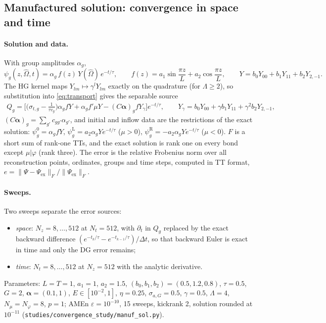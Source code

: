 \documentclass[11pt,a4paper]{article}
\newcommand{\Om}{\hat{\Omega}}
\newcommand{\Lmax}{\Lambda}
\newcommand{\code}[1]{\texttt{#1}}
\begin{document}
\subsection{Manufactured solution: convergence in space and time}
\label{sec:mms}

\paragraph{Solution and data.} With group amplitudes $\alpha_g$,
\begin{equation}
\psi_g(z,\Om,t)=\alpha_g\,f(z)\,Y(\Om)\,e^{-t/\tau},\qquad
f(z)=a_1\sin\frac{\pi z}{L}+a_2\cos\frac{\pi z}{L},\qquad
Y=b_0Y_{00}+b_1Y_{11}+b_2Y_{2,-1}.
\end{equation}
The HG kernel maps $Y_{lm}\mapsto\gamma^lY_{lm}$ exactly on the quadrature (for $\Lmax\ge2$), so substitution into \eqref{eq:transport} gives the separable source
\begin{gather}
Q_g=\Big[\Big(\sigma_{t,g}-\frac{1}{\tau v_g}\Big)\alpha_gfY+\alpha_gf'\mu Y-(C\bm\alpha)_gfY_\gamma\Big]e^{-t/\tau},\qquad
Y_\gamma=b_0Y_{00}+\gamma b_1Y_{11}+\gamma^2b_2Y_{2,-1},
\end{gather}
$(C\bm\alpha)_g=\sum_{g'}c_{gg'}\alpha_{g'}$, and initial and inflow data are the restrictions of the exact solution: $\psi^0_g=\alpha_gfY$, $\psi^{\mathrm L}_g=a_2\alpha_gYe^{-t/\tau}$ ($\mu>0$), $\psi^{\mathrm R}_g=-a_2\alpha_gYe^{-t/\tau}$ ($\mu<0$). $F$ is a short sum of rank-one TTs, and the exact solution is rank one on every bond except $\mu|\varphi$ (rank three). The error is the relative Frobenius norm over all reconstruction points, ordinates, groups and time steps, computed in TT format, $e=\|\Psi-\Psi_{\mathrm{ex}}\|_F/\|\Psi_{\mathrm{ex}}\|_F$.

\paragraph{Sweeps.} Two sweeps separate the error sources:
\begin{itemize}[nosep]
\item \emph{space}: $N_z=8,\dots,512$ at $N_t=512$, with $\partial_t$ in $Q_g$ replaced by the exact backward difference $(e^{-t_k/\tau}-e^{-t_{k-1}/\tau})/\Delta t$, so that backward Euler is exact in time and only the DG error remains;
\item \emph{time}: $N_t=8,\dots,512$ at $N_z=512$ with the analytic derivative.
\end{itemize}
Parameters: $L=T=1$, $a_1=1$, $a_2=1.5$, $(b_0,b_1,b_2)=(0.5,1.2,0.8)$, $\tau=0.5$, $G=2$, $\bm\alpha=(0.1,1)$, $E\in[10^{-2},1]$, $\eta=0.25$, $\sigma_{a,G}=0.5$, $\gamma=0.5$, $\Lmax=4$, $N_\mu=N_\varphi=8$, $p=1$; AMEn $\varepsilon=10^{-10}$, 15 sweeps, kickrank 2, solution rounded at $10^{-11}$ (\code{studies/convergence\_study/manuf\_sol.py}).
\end{document}
